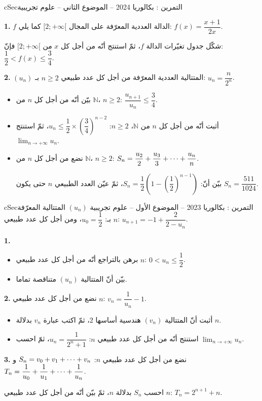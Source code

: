 \documentclass[12pt,a4paper]{article}
\newenvironment{BOX}[2]{\begin{otherlanguage}{english}\begin{arbox}{#1}{#2}}{\end{arbox}\end{otherlanguage}}
\newcounter{exo}
\newenvironment{tamrin}[1]{\stepcounter{exo}\begin{BOX}{cSec}{التمرين \theexo: #1}}{\end{BOX}}
\renewcommand{\cdots}{\mathinner{\cdotp\cdotp\cdotp}}
\newcommand{\N}{\mathbb{N}}
\newcommand{\limn}{\displaystyle\lim_{n\to+\infty}}
\newenvironment{sq}{\begin{itemize}[leftmargin=2.4em,itemsep=3pt]}{\end{itemize}}
\newcommand{\qa}{\item[(أ)]}\newcommand{\qb}{\item[(ب)]}\newcommand{\qc}{\item[(جـ)]}\newcommand{\qd}{\item[(د)]}\newcommand{\qe}{\item[(هـ)]}
\newcommand{\QQ}[1]{\par\smallskip\textbf{#1.} }
\begin{document}
\begin{tamrin}{بكالوريا 2024 -- الموضوع الثاني -- علوم تجريبية}
\QQ{1} $f$ الدالة العددية المعرّفة على المجال $[2;+\infty[$ كما يلي: $f(x)=\dfrac{x+1}{2x}$.

شكّل جدول تغيّرات الدالة $f$، ثمّ استنتج أنّه من أجل كل $x$ من $[2;+\infty[$ فإنّ: $\dfrac12<f(x)\leqslant\dfrac34$.

\QQ{2} $(u_n)$ المتتالية العددية المعرّفة من أجل كل عدد طبيعي $n\geqslant 2$ بـ: $u_n=\dfrac{n}{2^n}$.
\begin{sq}
\qa بيّن أنّه من أجل كل $n$ من $\N$، $n\geqslant 2$: $\dfrac{u_{n+1}}{u_n}\leqslant\dfrac34$.
\qb أثبت أنّه من أجل كل $n$ من $\N$، $n\geqslant 2$: $u_n\leqslant\dfrac12\times\left(\dfrac34\right)^{n-2}$، ثمّ استنتج $\limn u_n$.
\qc نضع من أجل كل $n$ من $\N$، $n\geqslant 2$: $S_n=\dfrac{u_2}{2}+\dfrac{u_3}{3}+\cdots+\dfrac{u_n}{n}$.

بيّن أنّ: $S_n=\dfrac12\left(1-\left(\dfrac12\right)^{n-1}\right)$، ثمّ عيّن العدد الطبيعي $n$ حتى يكون $S_n=\dfrac{511}{1024}$.
\end{sq}
\end{tamrin}

\begin{tamrin}{بكالوريا 2023 -- الموضوع الأول -- علوم تجريبية}
$(u_n)$ المتتالية المعرّفة بـ: $u_0=\dfrac12$، ومن أجل كل عدد طبيعي $n$: $u_{n+1}=-1+\dfrac{2}{2-u_n}$.

\QQ{1}
\begin{sq}
\qa برهن بالتراجع أنّه من أجل كل عدد طبيعي $n$: $0<u_n\leqslant\dfrac12$.
\qb بيّن أنّ المتتالية $(u_n)$ متناقصة تماما.
\end{sq}
\QQ{2} نضع من أجل كل عدد طبيعي $n$: $v_n=\dfrac{1}{u_n}-1$.
\begin{sq}
\qa أثبت أنّ المتتالية $(v_n)$ هندسية أساسها $2$، ثمّ اكتب عبارة $v_n$ بدلالة $n$.
\qb استنتج أنّه من أجل كل عدد طبيعي $n$: $u_n=\dfrac{1}{2^n+1}$، ثمّ احسب $\limn u_n$.
\end{sq}
\QQ{3} نضع من أجل كل عدد طبيعي $n$: $S_n=v_0+v_1+\cdots+v_n$ و$T_n=\dfrac{1}{u_0}+\dfrac{1}{u_1}+\cdots+\dfrac{1}{u_n}$.

احسب $S_n$ بدلالة $n$، ثمّ بيّن أنّه من أجل كل عدد طبيعي $n$: $T_n=2^{n+1}+n$.
\end{tamrin}
\end{document}
